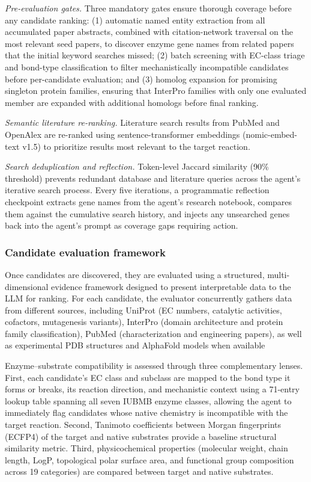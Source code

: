 \documentclass[12pt]{article}
\begin{document}
\textit{Pre-evaluation gates.} Three mandatory gates ensure thorough coverage before any candidate ranking: (1) automatic named entity extraction from all accumulated paper abstracts, combined with citation-network traversal on the most relevant seed papers, to discover enzyme gene names from related papers that the initial keyword searches missed; (2) batch screening with EC-class triage and bond-type classification to filter mechanistically incompatible candidates before per-candidate evaluation; and (3) homolog expansion for promising singleton protein families, ensuring that InterPro families with only one evaluated member are expanded with additional homologs before final ranking.

\textit{Semantic literature re-ranking.} Literature search results from PubMed and OpenAlex are re-ranked using sentence-transformer embeddings (nomic-embed-text v1.5)\cite{nussbaum2024nomic} to prioritize results most relevant to the target reaction.

\textit{Search deduplication and reflection.} Token-level Jaccard similarity (90\% threshold) prevents redundant database and literature queries across the agent's iterative search process. Every five iterations, a programmatic reflection checkpoint extracts gene names from the agent's research notebook, compares them against the cumulative search history, and injects any unsearched genes back into the agent's prompt as coverage gaps requiring action.

\subsubsection{Candidate evaluation framework}
\label{sec:evaluation_framework}
Once candidates are discovered, they are evaluated using a structured, multi-dimensional evidence framework designed to present interpretable data to the LLM for ranking. For each candidate, the evaluator concurrently gathers data from different sources, including UniProt (EC numbers, catalytic activities, cofactors, mutagenesis variants), InterPro (domain architecture and protein family classification), PubMed (characterization and engineering papers), as well as experimental PDB structures and AlphaFold models when available

Enzyme--substrate compatibility is assessed through three complementary lenses. First, each candidate's EC class and subclass are mapped to the bond type it forms or breaks, its reaction direction, and mechanistic context using a 71-entry lookup table spanning all seven IUBMB enzyme classes, allowing the agent to immediately flag candidates whose native chemistry is incompatible with the target reaction. Second, Tanimoto coefficients between Morgan fingerprints\cite{rogers2010ecfp} (ECFP4) of the target and native substrates provide a baseline structural similarity metric. Third, physicochemical properties (molecular weight, chain length, LogP, topological polar surface area, and functional group composition across 19 categories) are compared between target and native substrates.
\end{document}
